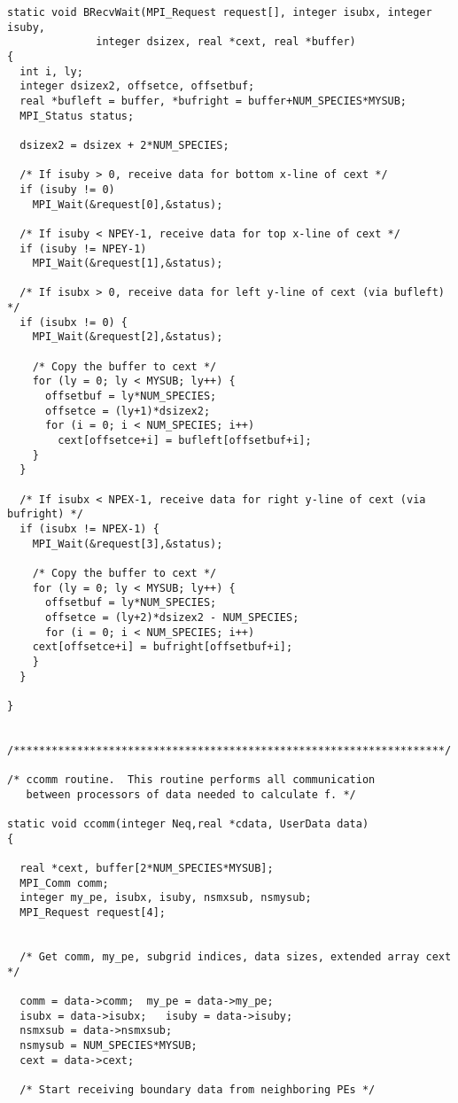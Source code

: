 \documentclass[11pt]{article}
\begin{document}
\begin{verbatim}
static void BRecvWait(MPI_Request request[], integer isubx, integer isuby,
              integer dsizex, real *cext, real *buffer)
{
  int i, ly;
  integer dsizex2, offsetce, offsetbuf;
  real *bufleft = buffer, *bufright = buffer+NUM_SPECIES*MYSUB;
  MPI_Status status;

  dsizex2 = dsizex + 2*NUM_SPECIES;

  /* If isuby > 0, receive data for bottom x-line of cext */
  if (isuby != 0)
    MPI_Wait(&request[0],&status);

  /* If isuby < NPEY-1, receive data for top x-line of cext */
  if (isuby != NPEY-1)
    MPI_Wait(&request[1],&status);

  /* If isubx > 0, receive data for left y-line of cext (via bufleft) */
  if (isubx != 0) {
    MPI_Wait(&request[2],&status);

    /* Copy the buffer to cext */
    for (ly = 0; ly < MYSUB; ly++) {
      offsetbuf = ly*NUM_SPECIES;
      offsetce = (ly+1)*dsizex2;
      for (i = 0; i < NUM_SPECIES; i++)
        cext[offsetce+i] = bufleft[offsetbuf+i];
    }
  }

  /* If isubx < NPEX-1, receive data for right y-line of cext (via bufright) */
  if (isubx != NPEX-1) {
    MPI_Wait(&request[3],&status);

    /* Copy the buffer to cext */
    for (ly = 0; ly < MYSUB; ly++) {
      offsetbuf = ly*NUM_SPECIES;
      offsetce = (ly+2)*dsizex2 - NUM_SPECIES;
      for (i = 0; i < NUM_SPECIES; i++)
    cext[offsetce+i] = bufright[offsetbuf+i];
    }
  }

}


/********************************************************************/

/* ccomm routine.  This routine performs all communication 
   between processors of data needed to calculate f. */

static void ccomm(integer Neq,real *cdata, UserData data)
{

  real *cext, buffer[2*NUM_SPECIES*MYSUB];
  MPI_Comm comm;
  integer my_pe, isubx, isuby, nsmxsub, nsmysub;
  MPI_Request request[4];


  /* Get comm, my_pe, subgrid indices, data sizes, extended array cext */

  comm = data->comm;  my_pe = data->my_pe;
  isubx = data->isubx;   isuby = data->isuby;
  nsmxsub = data->nsmxsub;
  nsmysub = NUM_SPECIES*MYSUB;
  cext = data->cext;

  /* Start receiving boundary data from neighboring PEs */


\end{verbatim}
\end{document}
